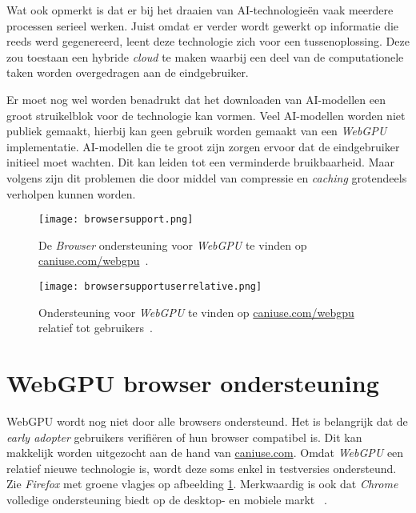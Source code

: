 \bigbreak{}

Wat \textcite{Fleetwood2022} ook opmerkt is dat er bij het draaien van  AI-technologieën vaak meerdere processen serieel werken. Juist omdat er verder wordt gewerkt op informatie die reeds werd gegenereerd, leent deze technologie zich voor een tussenoplossing. Deze zou toestaan een hybride \textit{cloud} te maken waarbij een deel van de computationele taken worden overgedragen aan de eindgebruiker.

\bigbreak{}

Er moet nog wel worden benadrukt dat het downloaden van AI-modellen een groot struikelblok voor de technologie kan vormen. Veel AI-modellen worden niet publiek gemaakt, hierbij kan geen gebruik worden gemaakt van een \textit{WebGPU} implementatie. AI-modellen die te groot zijn zorgen ervoor dat de eindgebruiker initieel moet wachten. Dit kan leiden tot een verminderde bruikbaarheid. Maar volgens \textcite{Fleetwood2022} zijn dit problemen die door middel van compressie en \textit{caching} grotendeels verholpen kunnen worden.

\break{}

\begin{figure}
    \texttt{[image: browsersupport.png]}
    \caption[Ondersteuning voor \textit{WebGPU}~\autocite{Deveria2024}]{
        De \textit{Browser} ondersteuning voor \textit{WebGPU} te vinden op \href{https://caniuse.com/webgpu}{caniuse.com/webgpu}~\autocite{Deveria2024}.
    }
    \label{fig:Browser Support}
\end{figure}

\begin{figure}
    \texttt{[image: browsersupportuserrelative.png]}
    \caption[Eindgebruikers met toegang tot \textit{WebGPU}~\autocite{Deveria2024}]{
        Ondersteuning voor \textit{WebGPU} te vinden op \href{https://caniuse.com/webgpu}{caniuse.com/webgpu} relatief tot gebruikers~\autocite{Deveria2024}.
    }
    \label{fig:Relative Browser Support}
\end{figure}

\section{WebGPU browser ondersteuning}

WebGPU wordt nog niet door alle browsers ondersteund. Het is belangrijk dat de \textit{early adopter} gebruikers verifiëren of hun browser compatibel is. Dit kan makkelijk worden uitgezocht aan de hand van \href{https://caniuse.com/webgpu}{caniuse.com}. Omdat \textit{WebGPU} een relatief nieuwe technologie is, wordt deze soms enkel in testversies ondersteund. Zie \textit{Firefox} met groene vlagjes op afbeelding \ref{fig:Browser Support}. Merkwaardig is ook dat \textit{Chrome} volledige ondersteuning biedt op de desktop- en mobiele markt ~\autocite{Deveria2024}.

